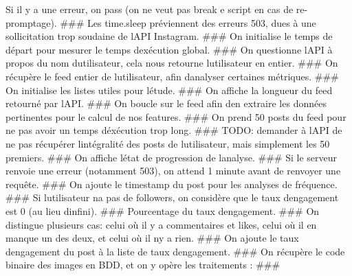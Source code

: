 Si il y a une erreur, on pass (on ne veut pas break e script en cas de re-\/promptage). \#\#\# Les {\ttfamily time.\+sleep} préviennent des erreurs 503, dues à une sollicitation trop soudaine de l\textquotesingle{}A\+PI Instagram. \#\#\# On initialise le temps de départ pour mesurer le temps d\textquotesingle{}exécution global. \#\#\# On questionne l\textquotesingle{}A\+PI à propos du nom d\textquotesingle{}utilisateur, cela nous retourne l\textquotesingle{}utilisateur en entier. \#\#\# On récupère le feed entier de l\textquotesingle{}utilisateur, afin d\textquotesingle{}analyser certaines métriques. \#\#\# On initialise les listes utiles pour l\textquotesingle{}étude. \#\#\# On affiche la longueur du feed retourné par l\textquotesingle{}A\+PI. \#\#\# On boucle sur le feed afin d\textquotesingle{}en extraire les données pertinentes pour le calcul de nos features. \#\#\# On prend 50 posts du feed pour ne pas avoir un temps d\textquotesingle{}éxécution trop long. \#\#\# T\+O\+DO\+: demander à l\textquotesingle{}A\+PI de ne pas récupérer l\textquotesingle{}intégralité des posts de l\textquotesingle{}utilisateur, mais simplement les 50 premiers. \#\#\# On affiche l\textquotesingle{}état de progression de l\textquotesingle{}analyse. \#\#\# Si le serveur renvoie une erreur (notamment 503), on attend 1 minute avant de renvoyer une requête. \#\#\# On ajoute le timestamp du post pour les analyses de fréquence. \#\#\# Si l\textquotesingle{}utilisateur n\textquotesingle{}a pas de followers, on considère que le taux d\textquotesingle{}engagement est 0 (au lieu d\textquotesingle{}infini). \#\#\# Pourcentage du taux d\textquotesingle{}engagement. \#\#\# On distingue plusieurs cas\+: celui où il y a commentaires et likes, celui où il en manque un des deux, et celui où il n\textquotesingle{}y a rien. \#\#\# On ajoute le taux d\textquotesingle{}engagement du post à la liste de taux d\textquotesingle{}engagement. \#\#\# On récupère le code binaire des images en B\+DD, et on y opère les traitements \+: \#\#\#
